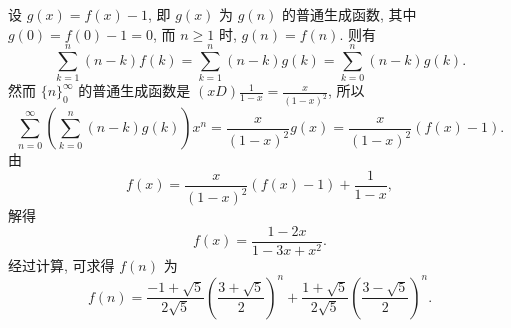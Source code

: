 \documentclass[punct]{ctexbeamer}
\begin{document}
\begin{frame}
	设 $g(x)=f(x)-1$, 即 $g(x)$ 为 $g(n)$ 的普通生成函数, 其中 $g(0)=f(0)-1=0$, 而 $n \geq 1$ 时, $g(n)=f(n)$. 则有
	$$
	\sum_{k=1}^n(n-k) f(k)=\sum_{k=1}^n(n-k) g(k)=\sum_{k=0}^n(n-k) g(k) .
	$$
	然而 $\{n\}_0^{\infty}$ 的普通生成函数是 $(x D) \frac{1}{1-x}=\frac{x}{(1-x)^2}$, 所以
	$$
	\sum_{n=0}^{\infty}\left(\sum_{k=0}^n(n-k) g(k)\right) x^n=\frac{x}{(1-x)^2} g(x)=\frac{x}{(1-x)^2}(f(x)-1) .
	$$
	由
	$$
	f(x)=\frac{x}{(1-x)^2}(f(x)-1)+\frac{1}{1-x},
	$$
	解得
	$$
	f(x)=\frac{1-2 x}{1-3 x+x^2}.
	$$
经过计算, 可求得 $f(n)$ 为
$$
f(n)=\frac{-1+\sqrt{5}}{2 \sqrt{5}}\left(\frac{3+\sqrt{5}}{2}\right)^n+\frac{1+\sqrt{5}}{2 \sqrt{5}}\left(\frac{3-\sqrt{5}}{2}\right)^n .
$$
\end{frame}
\end{document}
